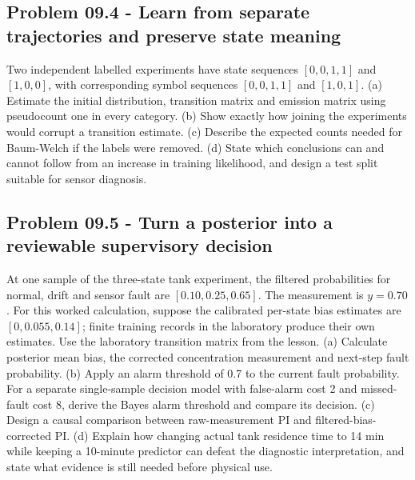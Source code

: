 \documentclass[11pt,a4paper]{article}
\begin{document}
\subsection{Problem 09.4 - Learn from separate trajectories and preserve state meaning}
Two independent labelled experiments have state sequences $[0,0,1,1]$ and $[1,0,0]$, with corresponding symbol sequences $[0,0,1,1]$ and $[1,0,1]$. (a) Estimate the initial distribution, transition matrix and emission matrix using pseudocount one in every category. (b) Show exactly how joining the experiments would corrupt a transition estimate. (c) Describe the expected counts needed for Baum-Welch if the labels were removed. (d) State which conclusions can and cannot follow from an increase in training likelihood, and design a test split suitable for sensor diagnosis.

\clearpage
\subsection{Problem 09.5 - Turn a posterior into a reviewable supervisory decision}
At one sample of the three-state tank experiment, the filtered probabilities for normal, drift and sensor fault are $[0.10,0.25,0.65]$. The measurement is $y=0.70$. For this worked calculation, suppose the calibrated per-state bias estimates are $[0,0.055,0.14]$; finite training records in the laboratory produce their own estimates. Use the laboratory transition matrix from the lesson. (a) Calculate posterior mean bias, the corrected concentration measurement and next-step fault probability. (b) Apply an alarm threshold of 0.7 to the current fault probability. For a separate single-sample decision model with false-alarm cost 2 and missed-fault cost 8, derive the Bayes alarm threshold and compare its decision. (c) Design a causal comparison between raw-measurement PI and filtered-bias-corrected PI. (d) Explain how changing actual tank residence time to 14 min while keeping a 10-minute predictor can defeat the diagnostic interpretation, and state what evidence is still needed before physical use.
\end{document}
